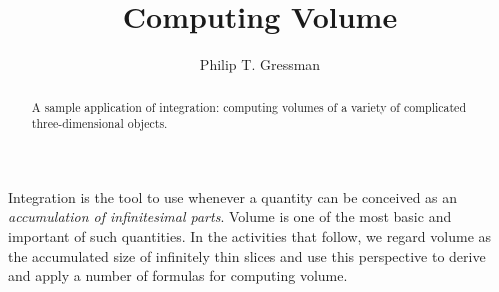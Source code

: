 \documentclass{ximera}
\title{Computing Volume}
\author{Philip T. Gressman}
\begin{document}
\begin{abstract}
  A sample application of integration: computing volumes of a variety of complicated three-dimensional objects.
\end{abstract}
\maketitle

Integration is the tool to use whenever a quantity can be conceived as an \textit{accumulation of infinitesimal parts}. 
Volume is one of the most basic and important of such quantities. In the activities that follow, we regard volume as the accumulated size of infinitely thin slices and use this perspective to derive and apply a number of formulas for computing volume.
\end{document}
